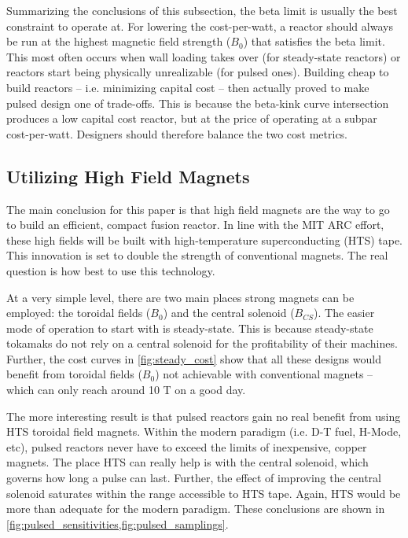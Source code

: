 Summarizing the conclusions of this subsection, the beta limit is usually the best constraint to operate at. For lowering the cost-per-watt, a reactor should always be run at the highest magnetic field strength ($B_0$) that satisfies the beta limit. This most often occurs when wall loading takes over (for steady-state reactors) or reactors start being physically unrealizable (for pulsed ones). Building cheap to build reactors -- i.e. minimizing capital cost -- then actually proved to make pulsed design one of trade-offs. This is because the beta-kink curve intersection produces a low capital cost reactor, but at the price of operating at a subpar cost-per-watt. Designers should therefore balance the two cost metrics.

\subsection{Utilizing High Field Magnets}

The main conclusion for this paper is that high field magnets are the way to go to build an efficient, compact fusion reactor. In line with the MIT ARC effort, these high fields will be built with high-temperature superconducting (HTS) tape. This innovation is set to double the strength of conventional magnets. The real question is how best to use this technology.

At a very simple level, there are two main places strong magnets can be employed: the toroidal fields ($B_0$) and the central solenoid ($B_{CS}$). The easier mode of operation to start with is steady-state. This is because steady-state tokamaks do not rely on a central solenoid for the profitability of their machines. Further, the cost curves in \cref{fig:steady_cost} show that all these designs would benefit from toroidal fields ($B_0$) not achievable with conventional magnets -- which can only reach around 10 T on a good day.

The more interesting result is that pulsed reactors gain no real benefit from using HTS toroidal field magnets. Within the modern paradigm (i.e. D-T fuel, H-Mode, etc), pulsed reactors never have to exceed the limits of inexpensive, copper magnets. The place HTS can really help is with the central solenoid, which governs how long a pulse can last. Further, the effect of improving the central solenoid saturates within the range accessible to HTS tape. Again, HTS would be more than adequate for the modern paradigm. These conclusions are shown in \cref{fig:pulsed_sensitivities,fig:pulsed_samplings}.

